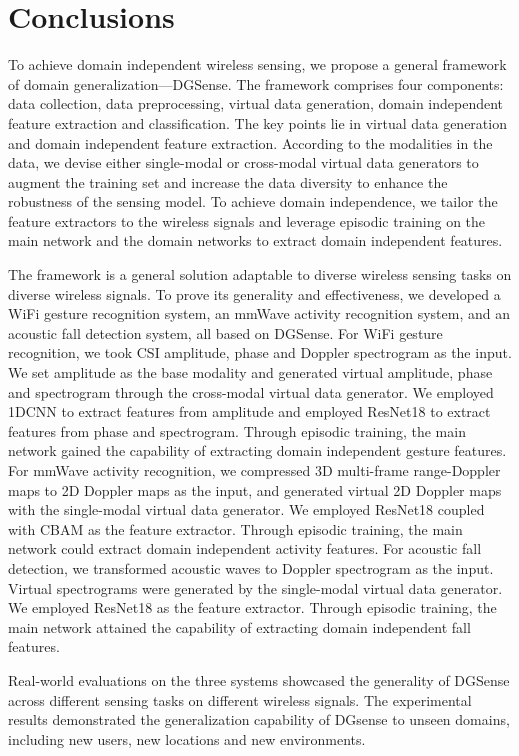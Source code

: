 \documentclass[journal]{IEEEtran}
\begin{document}
\section{Conclusions}
\label{SecConclusions}
To achieve domain independent wireless sensing, we propose a general framework of domain generalization---DGSense. The framework comprises four components: data collection, data preprocessing, virtual data generation, domain independent feature extraction and classification. The key points lie in virtual data generation and domain independent feature extraction. According to the modalities in the data, we devise either single-modal or cross-modal virtual data generators to augment the training set and increase the data diversity to enhance the robustness of the sensing model. To achieve domain independence, we tailor the feature extractors to the wireless signals and leverage episodic training on the main network and the domain networks to extract domain independent features. 

The framework is a general solution adaptable to diverse wireless sensing tasks on diverse wireless signals. To prove its generality and effectiveness, we developed a WiFi gesture recognition system, an mmWave activity recognition system, and an acoustic fall detection system, all based on DGSense. 
%
For WiFi gesture recognition, we took CSI amplitude, phase and Doppler spectrogram as the input. We set amplitude as the base modality and generated virtual amplitude, phase and spectrogram through the cross-modal virtual data generator. We employed 1DCNN to extract features from amplitude and employed ResNet18 to extract features from phase and spectrogram. Through episodic training, the main network gained the capability of extracting domain independent gesture features. 
%
For mmWave activity recognition, we compressed 3D multi-frame range-Doppler maps to 2D Doppler maps as the input, and generated virtual 2D Doppler maps with the single-modal virtual data generator. We employed ResNet18 coupled with CBAM as the feature extractor. Through episodic training, the main network could extract domain independent activity features. 
%
For acoustic fall detection, we transformed acoustic waves to Doppler spectrogram as the input. Virtual spectrograms were generated by the single-modal virtual data generator. We employed ResNet18 as the feature extractor. Through episodic training, the main network attained the capability of extracting domain independent fall features. 

Real-world evaluations on the three systems showcased the generality of DGSense across different sensing tasks on different wireless signals. The experimental results demonstrated the generalization capability of DGsense to unseen domains, including new users, new locations and new environments. 




\end{document}
